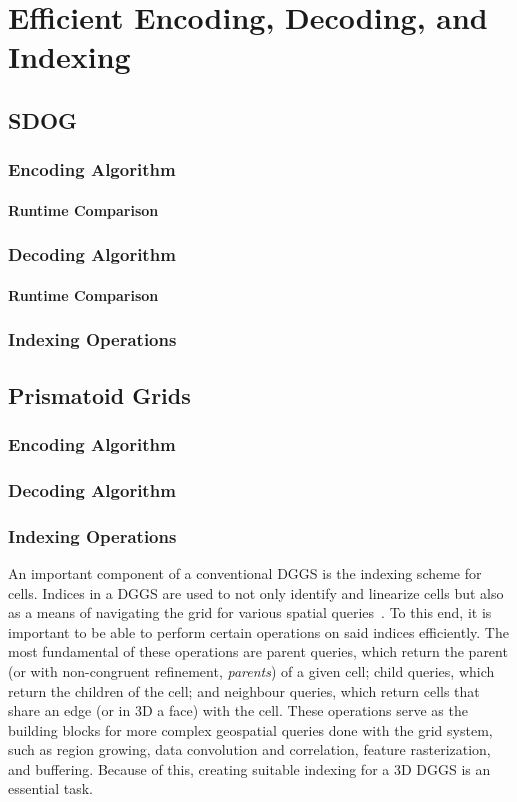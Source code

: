 \chapter{Efficient Encoding, Decoding, and Indexing} \label{chap:coding}

\section{SDOG}
\subsection{Encoding Algorithm}
\subsubsection{Runtime Comparison}
\subsection{Decoding Algorithm}
\subsubsection{Runtime Comparison}
\subsection{Indexing Operations}

\section{Prismatoid Grids}
\subsection{Encoding Algorithm}
\subsection{Decoding Algorithm}
\subsection{Indexing Operations} \label{sec:indexing}
An important component of a conventional DGGS is the indexing scheme for cells.
Indices in a DGGS are used to not only identify and linearize cells but also as a means of navigating the grid for various spatial queries~\cite{alderson2020digital}.
To this end, it is important to be able to perform certain operations on said indices efficiently.
The most fundamental of these operations are parent queries, which return the parent (or with non-congruent refinement, \textit{parents}) of a given cell; child queries, which return the children of the cell; and neighbour queries, which return cells that share an edge (or in 3D a face) with the cell.
These operations serve as the building blocks for more complex geospatial queries done with the grid system, such as region growing, data convolution and correlation, feature rasterization, and buffering.
Because of this, creating suitable indexing for a 3D DGGS is an essential task.


